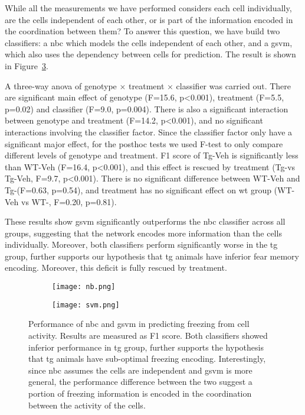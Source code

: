 While all the measurements we have performed considers each cell individually, are the cells independent of each other, or is part of the information encoded in the coordination between them? To answer this question, we have build two classifiers: a \gls{nbc} which models the cells independent of each other, and a \gls{gsvm}, which also uses the dependency between cells for prediction. The result is shown in Figure~\ref{f.ad.classifier}. 

A three-way \gls{anova} of genotype $\times$ treatment $\times$ classifier was carried out. There are significant main effect of genotype (F=15.6, p<0.001), treatment (F=5.5, p=0.02) and classifier (F=9.0, p=0.004). There is also a significant interaction between genotype and treatment (F=14.2, p<0.001), and no significant interactions involving the classifier factor. Since the classifier factor only have a significant major effect, for the posthoc tests we used F-test to only compare different levels of genotype and treatment. F1 score of Tg-Veh is significantly less than WT-Veh (F=16.4, p<0.001), and this effect is rescued by \tglu treatment (Tg-\glu vs Tg-Veh, F=9.7, p<0.001). There is no significant difference between WT-Veh and Tg-\glu (F=0.63, p=0.54), and \tglu treatment has no significant effect on \gls{wt} group (WT-Veh vs WT-\glu, F=0.20, p=0.81).  

These results show \gls{gsvm} significantly outperforms the \gls{nbc} classifier across all groups, suggesting that the network encodes more information than the cells individually. Moreover, both classifiers perform significantly worse in the \gls{tg} group, further supports our hypothesis that \gls{tg} animals have inferior fear memory encoding. Moreover, this deficit is fully rescued by \tglu treatment.

\begin{figure}[h]
    \begin{subfigure}[h]{\textwidth}
        \texttt{[image: nb.png]}
        \caption{\label{f.ad.nb}}
    \end{subfigure}
    \begin{subfigure}[h]{\textwidth}
        \texttt{[image: svm.png]}
        \caption{\label{f.ad.svm}}
    \end{subfigure}
    \caption{Performance of  \gls{nbc} and  \gls{gsvm} in predicting freezing from cell activity. Results are measured as F1 score. Both classifiers showed inferior performance in \gls{tg} group, further supports the hypothesis that \gls{tg} animals have sub-optimal freezing encoding. Interestingly, since \gls{nbc} assumes the cells are independent and \gls{gsvm} is more general, the performance difference between the two suggest a portion of freezing information is encoded in the coordination between the activity of the cells. \label{f.ad.classifier}}
\end{figure}





